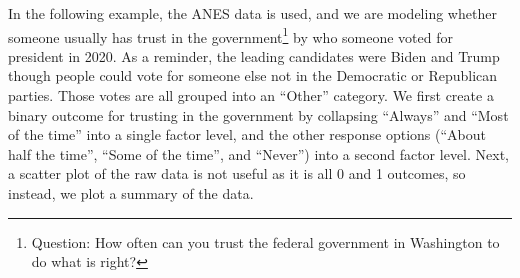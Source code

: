 \documentclass[
]{krantz}
\begin{document}
In the following example, the ANES data is used, and we are modeling whether someone usually has trust in the government\footnote{Question: How often can you trust the federal government in Washington to do what is right?} by who someone voted for president in 2020. As a reminder, the leading candidates were Biden and Trump though people could vote for someone else not in the Democratic or Republican parties. Those votes are all grouped into an ``Other'' category. We first create a binary outcome for trusting in the government by collapsing ``Always'' and ``Most of the time'' into a single factor level, and the other response options (``About half the time'', ``Some of the time'', and ``Never'') into a second factor level. Next, a scatter plot of the raw data is not useful as it is all 0 and 1 outcomes, so instead, we plot a summary of the data.
\end{document}
